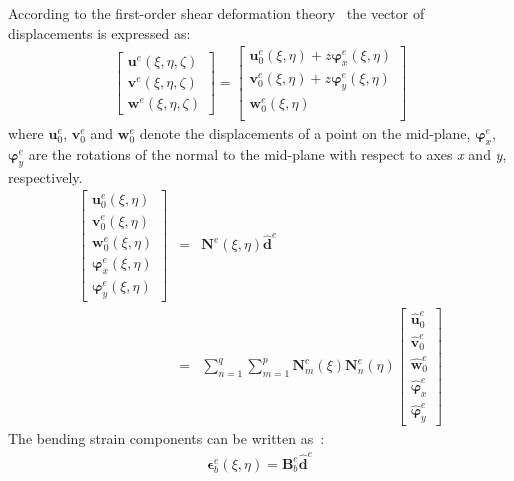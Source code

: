 \documentclass[materials,article,submit,moreauthors,pdftex]{Definitions/mdpi}
\begin{document}
According to the first-order shear deformation theory~\cite{reissner1945effect, mindlin1951influence} the vector of displacements is expressed as:
\begin{eqnarray}
\left [ \begin{array}{c}
\textbf{u}^e(\xi,\eta,\zeta) \\
\textbf{v}^e(\xi,\eta,\zeta) \\
\textbf{w}^e(\xi,\eta,\zeta)
\end{array} \right] = 
\left [ \begin{array}{c}
\textbf{u}_0^e(\xi,\eta) + z\boldsymbol{\varphi}_x^e(\xi,\eta)\\
\textbf{v}_0^e(\xi,\eta) + z\boldsymbol{\varphi}_y^e(\xi,\eta)\\
\textbf{w}_0^e(\xi,\eta) \\
\end{array} \right]
\end{eqnarray}
where \(\textbf{u}_0^e\), \(\textbf{v}_0^e\) and \(\textbf{w}_0^e\) denote the displacements of a point on the mid-plane, \(\boldsymbol{\varphi}_x^e\), \(\boldsymbol{\varphi}_y^e\) are the rotations of the normal to the mid-plane with respect to axes \textit{x} and \textit{y}, respectively.
\begin{eqnarray}
\left [ \begin{array}{c}
\textbf{u}_0^e(\xi,\eta) \\
\textbf{v}_0^e(\xi,\eta) \\
\textbf{w}_0^e(\xi,\eta) \\
\boldsymbol{\varphi}_x^e(\xi,\eta) \\
\boldsymbol{\varphi}_y^e(\xi,\eta)
\end{array} \right]
& = & \textbf{N}^e(\xi,\eta)\widehat{\textbf{d}}^e\nonumber\\
& = & \sum_{n=1}^q\sum_{m=1}^p\textbf{N}_m^e(\xi)\textbf{N}_n^e(\eta)
\left [ \begin{array}{c}
\widehat{\textbf{u}}_0^e \\
\widehat{\textbf{v}}_0^e \\
\widehat{\textbf{w}}_0^e \\
\widehat{\boldsymbol{\varphi}}_x^e \\
\widehat{\boldsymbol{\varphi}}_y^e
\end{array} \right]
\end{eqnarray}
The bending strain components can be written as~\cite{ferreira2008matlab}:
\begin{eqnarray}
\boldsymbol{\epsilon}_b^e(\xi,\eta)=\textbf{B}_b^e\widehat{\textbf{d}}^e
\end{eqnarray}
\end{document}
